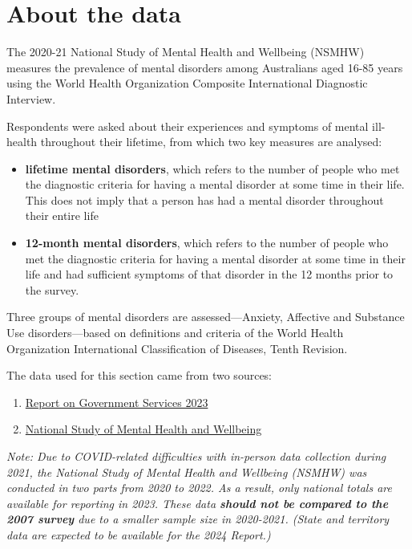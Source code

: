 \documentclass[
  a4paper,
  DIV=11,
  numbers=noendperiod]{scrreport}
\begin{document}
\hypertarget{about-the-data}{%
\section{About the data}\label{about-the-data}}

The 2020-21 National Study of Mental Health and Wellbeing (NSMHW)
measures the prevalence of mental disorders among Australians aged 16-85
years using the World Health Organization Composite International
Diagnostic Interview.

Respondents were asked about their experiences and symptoms of mental
ill-health throughout their lifetime, from which two key measures are
analysed:

\begin{itemize}
\item
  \textbf{lifetime mental disorders}, which refers to the number of
  people who met the diagnostic criteria for having a mental disorder at
  some time in their life. This does not imply that a person has had a
  mental disorder throughout their entire life
\item
  \textbf{12-month mental disorders}, which refers to the number of
  people who met the diagnostic criteria for having a mental disorder at
  some time in their life and had sufficient symptoms of that disorder
  in the 12 months prior to the survey.
\end{itemize}

Three groups of mental disorders are assessed---Anxiety, Affective and
Substance Use disorders---based on definitions and criteria of the World
Health Organization International Classification of Diseases, Tenth
Revision.

The data used for this section came from two sources:

\begin{enumerate}
\def\labelenumi{\arabic{enumi}.}
\item
  \href{https://www.pc.gov.au/ongoing/report-on-government-services/2023/health/services-for-mental-health}{Report
  on Government Services 2023}
\item
  \href{https://www.abs.gov.au/statistics/health/mental-health/national-study-mental-health-and-wellbeing/latest-release\#prevalence-of-mental-disorders}{National
  Study of Mental Health and Wellbeing}
\end{enumerate}

\emph{Note: Due to COVID-related difficulties with in-person data
collection during 2021, the National Study of Mental Health and
Wellbeing (NSMHW) was conducted in two parts from 2020 to 2022. As a
result, only national totals are available for reporting in 2023. These
data \textbf{should not be compared to the 2007 survey} due to a smaller
sample size in 2020-2021. (State and territory data are expected to be
available for the 2024 Report.)}
\end{document}
